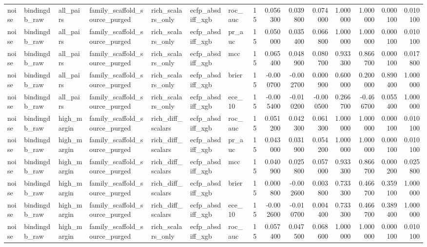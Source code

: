 \begin{longtable}{lllllllrrrrrrrr}
noise & bindingdb\_raw & all\_pairs & family\_scaffold\_source\_purged & rich\_scalars\_only & ecfp\_absdiff\_xgb & roc\_auc & 15 & 0.056300 & 0.039800 & 0.074000 & 1.000000 & 1.000000 & 0.000100 & 0.010100 \\
noise & bindingdb\_raw & all\_pairs & family\_scaffold\_source\_purged & rich\_scalars\_only & ecfp\_absdiff\_xgb & pr\_auc & 15 & 0.050000 & 0.035400 & 0.066800 & 1.000000 & 1.000000 & 0.000100 & 0.010100 \\
noise & bindingdb\_raw & all\_pairs & family\_scaffold\_source\_purged & rich\_scalars\_only & ecfp\_absdiff\_xgb & mcc & 15 & 0.065400 & 0.048900 & 0.080700 & 0.933300 & 0.866700 & 0.000100 & 0.017800 \\
noise & bindingdb\_raw & all\_pairs & family\_scaffold\_source\_purged & rich\_scalars\_only & ecfp\_absdiff\_xgb & brier & 15 & -0.000700 & -0.002700 & 0.000900 & 0.600000 & 0.200000 & 0.890400 & 1.000000 \\
noise & bindingdb\_raw & all\_pairs & family\_scaffold\_source\_purged & rich\_scalars\_only & ecfp\_absdiff\_xgb & ece\_10 & 15 & -0.005400 & -0.010200 & -0.000500 & 0.266700 & -0.466700 & 0.055400 & 1.000000 \\
noise & bindingdb\_raw & high\_margin & family\_scaffold\_source\_purged & rich\_diff\_scalars & ecfp\_absdiff\_xgb & roc\_auc & 15 & 0.051200 & 0.042300 & 0.061300 & 1.000000 & 1.000000 & 0.000100 & 0.010100 \\
noise & bindingdb\_raw & high\_margin & family\_scaffold\_source\_purged & rich\_diff\_scalars & ecfp\_absdiff\_xgb & pr\_auc & 15 & 0.043000 & 0.031900 & 0.054200 & 1.000000 & 1.000000 & 0.000100 & 0.010100 \\
noise & bindingdb\_raw & high\_margin & family\_scaffold\_source\_purged & rich\_diff\_scalars & ecfp\_absdiff\_xgb & mcc & 15 & 0.040900 & 0.025800 & 0.057000 & 0.933300 & 0.866700 & 0.000200 & 0.025800 \\
noise & bindingdb\_raw & high\_margin & family\_scaffold\_source\_purged & rich\_diff\_scalars & ecfp\_absdiff\_xgb & brier & 15 & 0.000800 & -0.002600 & 0.003800 & 0.733300 & 0.466700 & 0.359100 & 1.000000 \\
noise & bindingdb\_raw & high\_margin & family\_scaffold\_source\_purged & rich\_diff\_scalars & ecfp\_absdiff\_xgb & ece\_10 & 15 & -0.002600 & -0.010700 & 0.004400 & 0.733300 & 0.466700 & 0.389400 & 1.000000 \\
noise & bindingdb\_raw & high\_margin & family\_scaffold\_source\_purged & rich\_scalars\_only & ecfp\_absdiff\_xgb & roc\_auc & 15 & 0.057400 & 0.047500 & 0.068600 & 1.000000 & 1.000000 & 0.000100 & 0.010100 \\

\end{longtable}
